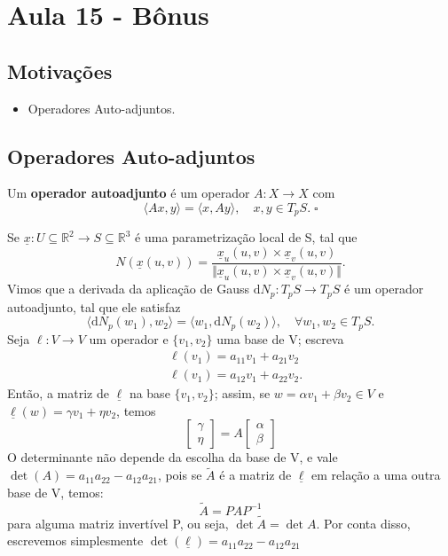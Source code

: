 \documentclass[../differential_geometry.tex]{subfiles}
\begin{document}
\section{Aula 15 - Bônus}
\subsection{Motivações}
\begin{itemize}
	\item Operadores Auto-adjuntos.
\end{itemize}
\subsection{Operadores Auto-adjuntos}
\begin{def*}
	Um \textbf{operador autoadjunto} é um operador \(A:X\rightarrow X\) com
	\[
		\langle Ax, y \rangle = \langle x, Ay \rangle, \quad x, y\in T_{p}S.\; \square
	\]
\end{def*}

Se \(\underline{x}:U\subseteq \mathbb{R}^{2}\rightarrow S\subseteq \mathbb{R}^{3}\) é uma parametrização local de S, tal que
\[
	N(\underline{x}(u, v))=\frac{\underline{x}_u(u, v)\times \underline{x}_v(u, v)}{\Vert \underline{x}_u(u, v)\times \underline{x}_v(u, v) \Vert}.
\]
Vimos que a derivada da aplicação de Gauss \(\mathrm{d}N_{p}:T_pS\rightarrow T_pS\) é um operador autoadjunto, tal que ele satisfaz
\[
	\langle \mathrm{d}N_{p}(w_1), w_2 \rangle = \langle w_1, \mathrm{d}N_p(w_2) \rangle, \quad \forall w_1, w_2\in T_pS.
\]
Seja \(\ell:V\rightarrow V\) um operador e \(\{v_1, v_2\}\) uma base de V; escreva
\begin{align*}
	 & \ell(v_1) = a_{11}v_1 + a_{21}v_2  \\
	 & \ell(v_1) = a_{12}v_1 + a_{22}v_2.
\end{align*}
Então, a matriz de \(\underline{\ell} \) na base \(\{v_1, v_2\}\); assim, se \(w = \alpha v_1 + \beta v_2\in V\)  e \(\underline{\ell }(w) = \gamma v_1 + \eta v_2\), temos
\[
	\begin{bmatrix}
		\gamma \\
		\eta
	\end{bmatrix} = A \begin{bmatrix}
		\alpha \\
		\beta
	\end{bmatrix}
\]
O determinante não depende da escolha da base de V, e vale \(\det{(A)} = a_{11}a_{22} - a_{12}a_{21}\), pois se \(\tilde{A}\) é a matriz de \(\underline{\ell }\) em relação a uma outra base de V, temos:
\[
	\tilde{A} = PAP^{-1}
\]
para alguma matriz invertível P, ou seja, \(\det{\tilde{A}} = \det{A}\). Por conta disso, escrevemos simplesmente \(\det{(\underline{\ell })=a_{11}a_{22}-a_{12}a_{21}}\)
\end{document}
